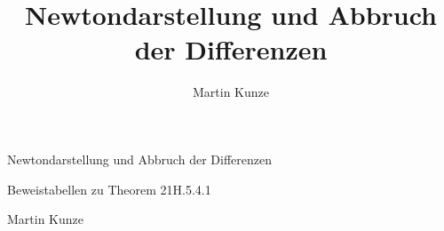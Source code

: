 \documentclass[main.tex]{subfiles}
\title{Newtondarstellung und Abbruch der Differenzen}
\author{Martin Kunze}
\date{}
\begin{document}
\hypersetup{hypertexnames=false}
\ProofReferencesOff
\hypertarget{newton.proofs}{}
\begin{center}
{\LARGE Newtondarstellung und Abbruch der Differenzen\par}
\medskip
{\large Beweistabellen zu Theorem 21H.5.4.1\par}
\smallskip
Martin Kunze
\end{center}

\end{document}
